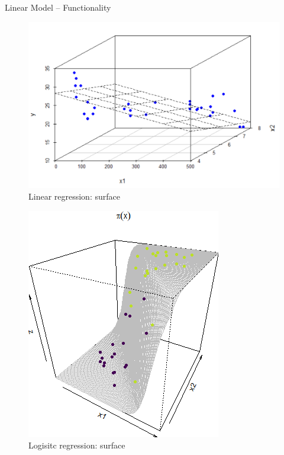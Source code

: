 \documentclass[11pt,compress,t,notes=noshow, xcolor=table]{beamer}
\begin{document}
\begin{frame}{Linear Model -- Functionality}
\begin{itemize}
\end{itemize}



\footnotesize
    \begin{minipage}{0.32\textwidth}
      \begin{center}
        \begin{figure}[h!]
          \caption{Linear regression: surface}
          \includegraphics[height=0.6\textwidth,keepaspectratio=true]{figure/linreg-surface.png}
        \end{figure}
      \end{center}
    \end{minipage}
    \begin{minipage}{0.32\textwidth}
      \begin{center}
        \begin{figure}[h!]
          \caption{Logisitc regression: surface}
          \includegraphics[height=0.6\textwidth, keepaspectratio=true]{figure/logreg-2vars-surface.png}

\end{figure}
\end{center}
\end{minipage}
\end{frame}
\end{document}
